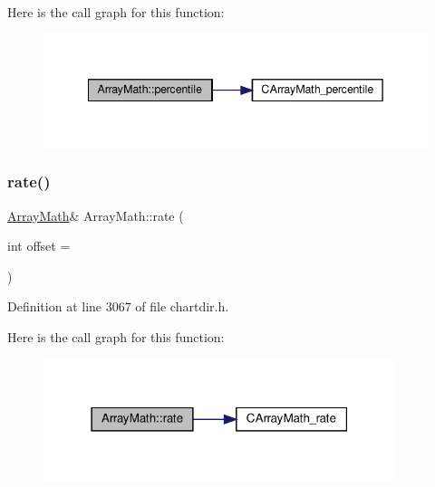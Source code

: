 Here is the call graph for this function\+:
\nopagebreak
\begin{figure}[H]
\begin{center}
\leavevmode
\includegraphics[width=342pt]{class_array_math_ae0342b531a9f73cabc2b13f81e2cef88_cgraph}
\end{center}
\end{figure}
\mbox{\label{class_array_math_a72a5a6a662b011b093a0aed0aac5df76}} 
\subsubsection{\texorpdfstring{rate()}{rate()}}
{\footnotesize\ttfamily \hyperlink{class_array_math}{Array\+Math}\& Array\+Math\+::rate (\begin{DoxyParamCaption}\item[{int}]{offset = {} }\end{DoxyParamCaption})\hspace{0.3cm}{\ttfamily [inline]}}



Definition at line 3067 of file chartdir.\+h.

Here is the call graph for this function\+:
\nopagebreak
\begin{figure}[H]
\begin{center}
\leavevmode
\includegraphics[width=291pt]{class_array_math_a72a5a6a662b011b093a0aed0aac5df76_cgraph}
\end{center}
\end{figure}
\mbox{\label{class_array_math_a3e735bfc88ee0149c7056cac1defbf6c}} 
